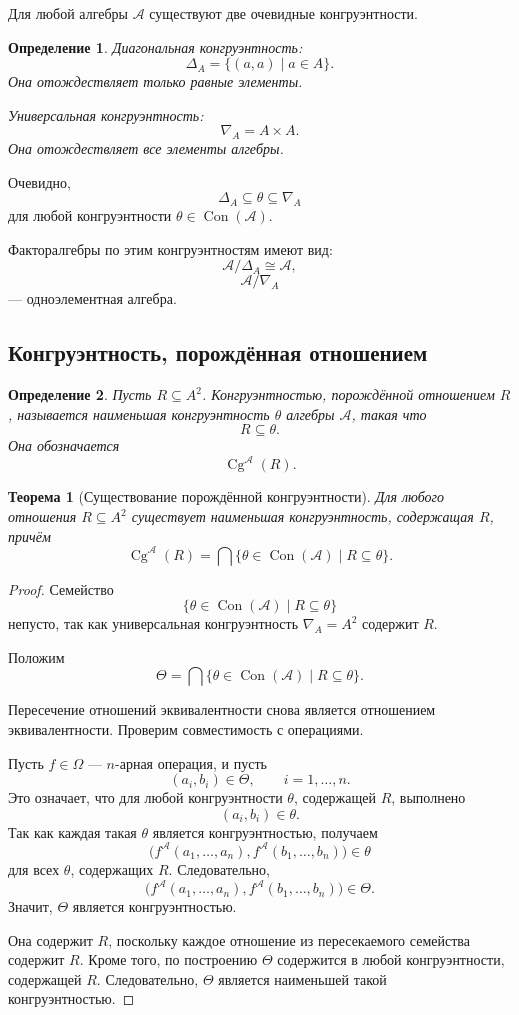 \documentclass[12pt,a4paper]{article}
\newtheorem{definition}{Определение}
\newtheorem{theorem}{Теорема}
\begin{document}
Для любой алгебры $\mathcal A$ существуют две очевидные конгруэнтности.

\begin{definition}
\emph{Диагональная конгруэнтность}:
\[
\Delta_A=\{(a,a)\mid a\in A\}.
\]
Она отождествляет только равные элементы.

\emph{Универсальная конгруэнтность}:
\[
\nabla_A=A\times A.
\]
Она отождествляет все элементы алгебры.
\end{definition}

Очевидно,
\[
\Delta_A\subseteq \theta\subseteq \nabla_A
\]
для любой конгруэнтности $\theta\in\operatorname{Con}(\mathcal A)$.

Факторалгебры по этим конгруэнтностям имеют вид:
\[
\mathcal A/\Delta_A\cong \mathcal A,
\]
\[
\mathcal A/\nabla_A
\]
--- одноэлементная алгебра.

\subsection{Конгруэнтность, порождённая отношением}

\begin{definition}
Пусть $R\subseteq A^2$. \emph{Конгруэнтностью, порождённой отношением $R$}, называется наименьшая конгруэнтность $\theta$ алгебры $\mathcal A$, такая что
\[
R\subseteq \theta.
\]
Она обозначается
\[
\operatorname{Cg}^{\mathcal A}(R).
\]
\end{definition}

\begin{theorem}[Существование порождённой конгруэнтности]
Для любого отношения $R\subseteq A^2$ существует наименьшая конгруэнтность, содержащая $R$, причём
\[
\operatorname{Cg}^{\mathcal A}(R)
=
\bigcap\{\theta\in\operatorname{Con}(\mathcal A)\mid R\subseteq\theta\}.
\]
\end{theorem}

\begin{proof}
Семейство
\[
\{\theta\in\operatorname{Con}(\mathcal A)\mid R\subseteq\theta\}
\]
непусто, так как универсальная конгруэнтность $\nabla_A=A^2$ содержит $R$.

Положим
\[
\Theta=
\bigcap\{\theta\in\operatorname{Con}(\mathcal A)\mid R\subseteq\theta\}.
\]

Пересечение отношений эквивалентности снова является отношением эквивалентности. Проверим совместимость с операциями.

Пусть $f\in\Omega$ --- $n$-арная операция, и пусть
\[
(a_i,b_i)\in\Theta,
\qquad i=1,\dots,n.
\]
Это означает, что для любой конгруэнтности $\theta$, содержащей $R$, выполнено
\[
(a_i,b_i)\in\theta.
\]
Так как каждая такая $\theta$ является конгруэнтностью, получаем
\[
\bigl(
f^{\mathcal A}(a_1,\dots,a_n),
f^{\mathcal A}(b_1,\dots,b_n)
\bigr)\in\theta
\]
для всех $\theta$, содержащих $R$. Следовательно,
\[
\bigl(
f^{\mathcal A}(a_1,\dots,a_n),
f^{\mathcal A}(b_1,\dots,b_n)
\bigr)\in\Theta.
\]
Значит, $\Theta$ является конгруэнтностью.

Она содержит $R$, поскольку каждое отношение из пересекаемого семейства содержит $R$. Кроме того, по построению $\Theta$ содержится в любой конгруэнтности, содержащей $R$. Следовательно, $\Theta$ является наименьшей такой конгруэнтностью.
\end{proof}
\end{document}
